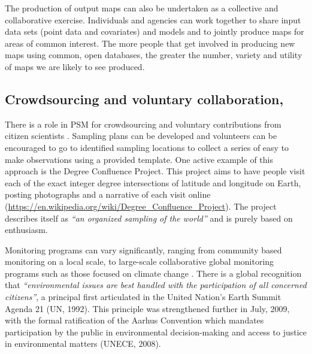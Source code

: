 \documentclass[graybox,natbib,nospthms,UStrade]{svmono}
\begin{document}
The production of output maps can also be undertaken as a collective and
collaborative exercise. Individuals and agencies can work together to
share input data sets (point data and covariates) and models and to
jointly produce maps for areas of common interest. The more people that
get involved in producing new maps using common, open databases, the
greater the number, variety and utility of maps we are likely to see
produced.

\hypertarget{crowdsourcing-and-voluntary-collaboration}{%
\subsection{Crowdsourcing and voluntary collaboration,}\label{crowdsourcing-and-voluntary-collaboration}}

There is a role in PSM for crowdsourcing and voluntary contributions
from citizen scientists \citep{Hengl2018OGH}. Sampling plans can be developed and volunteers
can be encouraged to go to identified sampling locations to collect a
series of easy to make observations using a provided template. One
active example of this approach is the Degree Confluence Project. This
project aims to have people visit each of the exact integer degree
intersections of latitude and longitude on Earth, posting photographs
and a narrative of each visit online
(\url{https://en.wikipedia.org/wiki/Degree_Confluence_Project}).
The project describes itself as \emph{``an organized sampling of the world''} and is
purely based on enthusiasm.

Monitoring programs can vary significantly, ranging from community based
monitoring on a local scale, to large-scale collaborative global
monitoring programs such as those focused on climate change \citep{lovett2007needs}.
There is a global recognition that
\emph{``environmental issues are best handled with the participation of all concerned citizens''},
a principal first articulated in the United
Nation's Earth Summit Agenda 21 (UN, 1992). This principle was
strengthened further in July, 2009, with the formal ratification of the
Aarhus Convention which mandates participation by the public in
environmental decision-making and access to justice in environmental
matters (UNECE, 2008).
\end{document}
